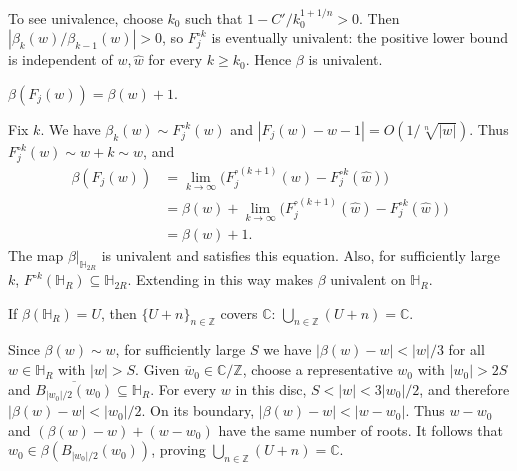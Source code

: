 \documentclass[11pt,a4paper]{article}
\begin{document}
To see univalence, choose $k_0$ such that $1-C'/k_0^{1+1/n}>0$. Then $|\beta_k(w)/\beta_{k-1}(w)|>0$, so $F_j^{\circ k}$ is eventually univalent: the positive lower bound is independent of $w,\widehat w$ for every $k\ge k_0$. Hence $\beta$ is univalent.
\begin{observation}[2]
$\beta(F_j(w))=\beta(w)+1$.
\end{observation}
Fix $k$. We have $\beta_k(w)\sim F_j^{\circ k}(w)$ and $|F_j(w)-w-1|=O(1/\sqrt[n]{|w|})$.
Thus $F_j^{\circ k}(w)\sim w+k\sim w$, and
\begin{align*}
\beta(F_j(w))
&=\lim_{k\to\infty}\bigl(F_j^{\circ(k+1)}(w)-F_j^{\circ k}(\widehat w)\bigr)\\
&=\beta(w)+\lim_{k\to\infty}
\bigl(F_j^{\circ(k+1)}(\widehat w)-F_j^{\circ k}(\widehat w)\bigr)\\
&=\beta(w)+1.
\end{align*}
The map $\beta|_{\mathbb H_{2R}}$ is univalent and satisfies this equation. Also, for sufficiently large $k$, $F^{\circ k}(\mathbb H_R)\subseteq\mathbb H_{2R}$. Extending in this way makes $\beta$ univalent on $\mathbb H_R$.
\begin{observation}[3]
If $\beta(\mathbb H_R)=U$, then $\{U+n\}_{n\in\mathbb Z}$ covers $\mathbb C$:
$\bigcup_{n\in\mathbb Z}(U+n)=\mathbb C$.
\end{observation}
Since $\beta(w)\sim w$, for sufficiently large $S$ we have $|\beta(w)-w|<|w|/3$ for all $w\in\mathbb H_R$ with $|w|>S$. Given $\overline w_0\in\mathbb C/\mathbb Z$, choose a representative $w_0$ with $|w_0|>2S$ and $\overline{B_{|w_0|/2}(w_0)}\subseteq\mathbb H_R$. For every $w$ in this disc, $S<|w|<3|w_0|/2$, and therefore $|\beta(w)-w|<|w_0|/2$.
On its boundary, $|\beta(w)-w|<|w-w_0|$. Thus $w-w_0$ and $(\beta(w)-w)+(w-w_0)$ have the same number of roots. It follows that $w_0\in\beta(B_{|w_0|/2}(w_0))$, proving $\bigcup_{n\in\mathbb Z}(U+n)=\mathbb C$.

\end{document}
